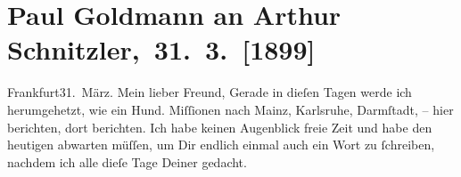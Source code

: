 

         
         \renewcommand{\erwaehntePersonen}{Personen: Leo Feld, Paul Goldmann, Clementine Goldmann, Carl Karlweis, Fedor Mamroth, Marie Reinhard, Josef Rosengart, Vally Rosengart, Ferdinand von Saar}
         \renewcommand{\erwaehnteInstitutionen}{Institutionen: Bauernfeld-Preis}
         \renewcommand{\erwaehnteOrte}{Orte: Darmstadt, Frankfurt am Main, Karlsruhe, Mainz, Wien, Wiesbaden}
         \renewcommand{\erwaehnteWerke}{}
               \section[ Paul Goldmann an Arthur Schnitzler, 31. 3. {[}1899{]}]{ Paul Goldmann an Arthur Schnitzler, 31. 3. {[}1899{]}}\nopagebreak{}\rehead{ }\begin{ledgroupsized}[t]{13cm}\normalsize\beginnumbering{} \toendnotes[C]{\smallbreak\pagebreak[2]} 
\toendnotes[C]{\smallbreak}\pstart
           \raggedleft{}{\pb}Frankfurt31. März.\pend
           \pstart\center{}Mein lieber Freund,\pend\pstart
           Gerade in dieſen Tagen werde ich herumgehetzt, wie ein Hund. Miſſionen nach Mainz, Karlsruhe, Darmſtadt, – hier berichten,
               dort berichten. Ich habe keinen Augenblick freie Zeit und habe den heutigen \label{K_L02871-1v}\label{K_L02871-1h} abwarten müſſen, um Dir endlich einmal auch ein Wort zu ſchreiben, nachdem
               ich \strikeout{\textcolor{gray}{×}\-\textcolor{gray}{×}\-\textcolor{gray}{×}} alle dieſe Tage \strikeout{\textcolor{gray}{×}\-\textcolor{gray}{×}\-\textcolor{gray}{×}}{ }\label{K_L02871-2v}\label{K_L02871-2h} Deiner gedacht.\pend

\end{ledgroupsized}

